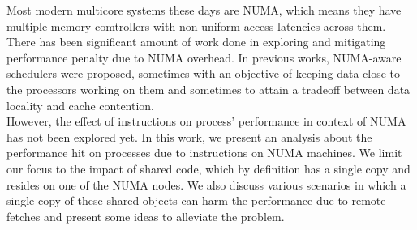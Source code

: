 
Most modern multicore systems these days are NUMA, which means they have multiple memory comtrollers
with non-uniform access latencies across them. There has been significant amount of work done in exploring and 
mitigating performance penalty due to NUMA overhead. In previous works, NUMA-aware schedulers were proposed,
sometimes with an objective of keeping data close to the processors working on them and sometimes to attain a 
tradeoff between data locality and cache contention. \\
However, the effect of instructions on process' performance in context of NUMA has not been explored yet.
In this work, we present an analysis about the performance hit on processes due to instructions on NUMA machines.
We limit our focus to the impact of shared code, which by definition has a single copy and resides on one of the NUMA nodes.
We also discuss various scenarios in which a single copy of these shared objects can harm the performance due to remote
fetches and present some ideas to alleviate the problem.

